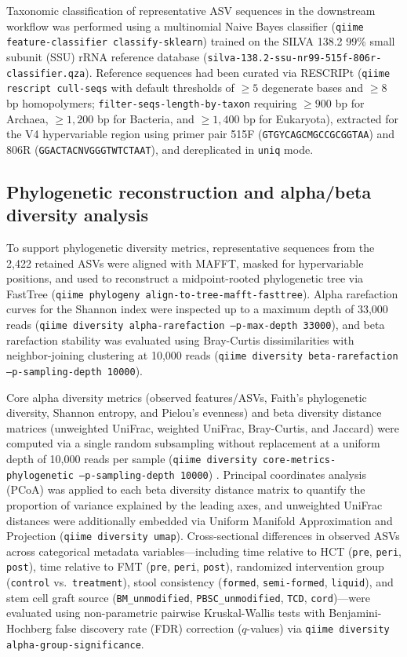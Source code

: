 Taxonomic classification of representative ASV sequences in the downstream workflow was performed using a multinomial Naive Bayes classifier (\texttt{qiime feature-classifier classify-sklearn}) trained on the SILVA 138.2 99\% small subunit (SSU) rRNA reference database \citep{quast2012silva} (\texttt{silva-138.2-ssu-nr99-515f-806r-classifier.qza}). Reference sequences had been curated via RESCRIPt (\texttt{qiime rescript cull-seqs} with default thresholds of $\ge 5$ degenerate bases and $\ge 8$ bp homopolymers; \texttt{filter-seqs-length-by-taxon} requiring $\ge 900$ bp for Archaea, $\ge 1,200$ bp for Bacteria, and $\ge 1,400$ bp for Eukaryota), extracted for the V4 hypervariable region using primer pair 515F (\texttt{GTGYCAGCMGCCGCGGTAA}) and 806R (\texttt{GGACTACNVGGGTWTCTAAT}), and dereplicated in \texttt{uniq} mode.

\subsection{Phylogenetic reconstruction and alpha/beta diversity analysis}
To support phylogenetic diversity metrics, representative sequences from the 2,422 retained ASVs were aligned with MAFFT, masked for hypervariable positions, and used to reconstruct a midpoint-rooted phylogenetic tree via FastTree (\texttt{qiime phylogeny align-to-tree-mafft-fasttree}). Alpha rarefaction curves for the Shannon index were inspected up to a maximum depth of 33,000 reads (\texttt{qiime diversity alpha-rarefaction --p-max-depth 33000}), and beta rarefaction stability was evaluated using Bray-Curtis dissimilarities with neighbor-joining clustering at 10,000 reads (\texttt{qiime diversity beta-rarefaction --p-sampling-depth 10000}).

Core alpha diversity metrics (observed features/ASVs, Faith's phylogenetic diversity, Shannon entropy, and Pielou's evenness) and beta diversity distance matrices (unweighted UniFrac, weighted UniFrac, Bray-Curtis, and Jaccard) were computed via a single random subsampling without replacement at a uniform depth of 10,000 reads per sample (\texttt{qiime diversity core-metrics-phylogenetic --p-sampling-depth 10000}) \citep{mcmurdie2013waste,raspet2024facilitating}. Principal coordinates analysis (PCoA) was applied to each beta diversity distance matrix to quantify the proportion of variance explained by the leading axes, and unweighted UniFrac distances were additionally embedded via Uniform Manifold Approximation and Projection (\texttt{qiime diversity umap}). Cross-sectional differences in observed ASVs across categorical metadata variables---including time relative to HCT (\texttt{pre}, \texttt{peri}, \texttt{post}), time relative to FMT (\texttt{pre}, \texttt{peri}, \texttt{post}), randomized intervention group (\texttt{control} vs.\ \texttt{treatment}), stool consistency (\texttt{formed}, \texttt{semi-formed}, \texttt{liquid}), and stem cell graft source (\texttt{BM\_unmodified}, \texttt{PBSC\_unmodified}, \texttt{TCD}, \texttt{cord})---were evaluated using non-parametric pairwise Kruskal-Wallis tests with Benjamini-Hochberg false discovery rate (FDR) correction ($q$-values) via \texttt{qiime diversity alpha-group-significance}.

